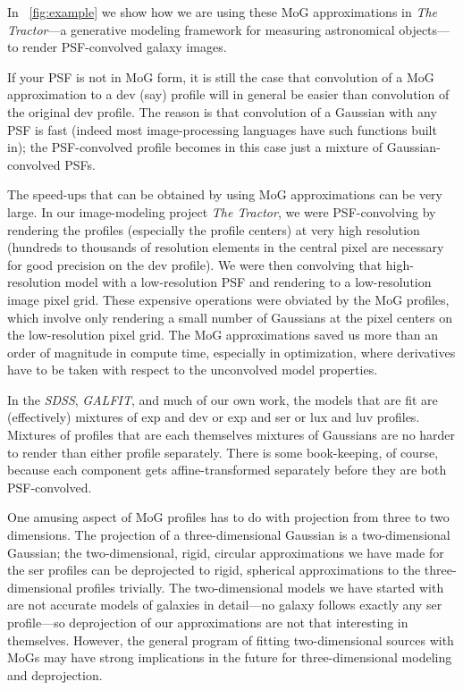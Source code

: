 \documentclass[12pt,pdftex,preprint]{aastex}
\newcommand{\project}[1]{\textsl{#1}}
\begin{document}
In \figurename~\ref{fig:example} we show how we are using these MoG
approximations in \project{The Tractor}---a generative modeling
framework for measuring astronomical objects---to render PSF-convolved
galaxy images.

If your PSF is not in MoG form, it is still the case that convolution
of a MoG approximation to a dev (say) profile will in general be
easier than convolution of the original dev profile.  The reason is
that convolution of a Gaussian with any PSF is fast (indeed most
image-processing languages have such functions built in); the
PSF-convolved profile becomes in this case just a mixture of
Gaussian-convolved PSFs.

The speed-ups that can be obtained by using MoG approximations can be
very large.  In our image-modeling project \project{The Tractor}, we
were PSF-convolving by rendering the profiles (especially the profile
centers) at very high resolution (hundreds to thousands of resolution
elements in the central pixel are necessary for good precision on the
dev profile).  We were then convolving that high-resolution model with
a low-resolution PSF and rendering to a low-resolution image pixel
grid.  These expensive operations were obviated by the MoG profiles,
which involve only rendering a small number of Gaussians at the pixel
centers on the low-resolution pixel grid.  The MoG approximations
saved us more than an order of magnitude in compute time, especially
in optimization, where derivatives have to be taken with respect to
the unconvolved model properties.

In the \project{SDSS}, \project{GALFIT}, and much of our own work, the
models that are fit are (effectively) mixtures of exp and dev or exp
and ser or lux and luv profiles.  Mixtures of profiles that are each
themselves mixtures of Gaussians are no harder to render than either
profile separately.  There is some book-keeping, of course, because
each component gets affine-transformed separately before they are both
PSF-convolved.

One amusing aspect of MoG profiles has to do with projection from
three to two dimensions.  The projection of a three-dimensional
Gaussian is a two-dimensional Gaussian; the two-dimensional, rigid,
circular approximations we have made for the ser profiles can be
deprojected to rigid, spherical approximations to the
three-dimensional profiles trivially.  The two-dimensional models we
have started with are not accurate models of galaxies in detail---no
galaxy follows exactly any ser profile---so deprojection of our
approximations are not that interesting in themselves.  However,
the general program of fitting two-dimensional sources with MoGs may
have strong implications in the future for three-dimensional modeling
and deprojection.
\end{document}
